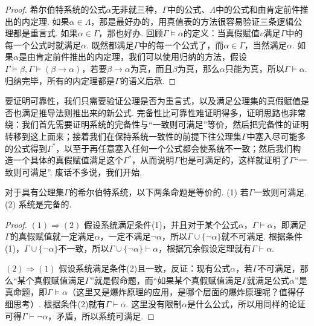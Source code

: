 \documentclass[main.tex]{subfiles}
\begin{document}
\begin{proof}
    希尔伯特系统的公式\(\alpha\)无非就三种，\(\Gamma\)中的公式、\(\Lambda\)中的公式和由肯定前件推出的内定理. \newline
    如果\(\alpha \in \Lambda\)，那是最好办的，用真值表的方法很容易验证三条逻辑公理都是重言式. \newline
    如果\(\alpha \in \Gamma\)，那也好办. 回顾\(\Gamma \vDash \alpha\)的定义：当真假赋值\(v\)满足\(\Gamma\)中的每一个公式时就满足\(\alpha\). 既然都满足\(\Gamma\)中的每一个公式了，而\(\alpha \in \Gamma\)，当然满足\(\alpha\). \newline
    如果\(\alpha\)是由肯定前件推出的内定理，我们可以使用归纳的方法，假设\(\Gamma \vDash \beta, \Gamma \vDash (\beta \to \alpha)\)，若要\(\beta \to \alpha\)为真，而且\(\beta\)为真，那么\(\alpha\)只能为真，所以\(\Gamma \vDash \alpha\). 归纳完毕，所有的内定理都是\(\Gamma\)的语义后承.
\end{proof}


\vspace{1cm}

要证明可靠性，我们只需要验证公理是否为重言式，以及满足公理集的真假赋值是否也满足推导法则推出来的新公式. 完备性比可靠性难证明得多，证明思路也非常绕：我们首先需要证明系统的完备性与“一致则可满足”等价，然后把完备性的证明转移到这上面来；接着我们在保持系统一致性的前提下往公理集\(\Gamma\)中塞入尽可能多的公式得到\(\Gamma^*\)，以至于再任意塞入任何一个公式都会使系统不一致；然后我们构造一个具体的真假赋值满足这个\(\Gamma^*\)，从而说明\(\Gamma\)也是可满足的，这样就证明了\(\Gamma\)“一致则可满足”. 废话不多说，我们开始.

\begin{lemma}{}
    对于具有公理集\(\Gamma\)的希尔伯特系统，以下两条命题是等价的. \newline
    (1) 若\(\Gamma\)一致则可满足. \newline
    (2) 系统是完备的.
\end{lemma}

\begin{proof}
    \((1)\Rightarrow(2)\)  假设系统满足条件(1)，并且对于某个公式\(\alpha\)，\(\Gamma \vDash \alpha\)，即满足\(\Gamma\)的真假赋值就一定满足\(\alpha\)，一定不满足\(\neg\alpha\)，所以\(\Gamma \cup \{\neg\alpha\}\)就不可满足. 根据条件(1)，\(\Gamma \cup \{\neg\alpha\}\)不一致，所以\(\Gamma \cup \{\neg \alpha\} \vdash \alpha\)，根据冗余假设定理就有\(\Gamma \vdash \alpha\).

    \((2)\Rightarrow(1)\)  假设系统满足条件(2)且一致，反证：现有公式\(\alpha\)，若\(\Gamma\)不可满足，那么“某个真假赋值满足\(\Gamma\)”就是假命题，而“如果某个真假赋值满足\(\Gamma\)就满足公式\(\alpha\)”是真命题，即\(\Gamma \vDash \alpha\)（这里又是爆炸原理的应用，是哪个层面的爆炸原理呢？值得仔细思考）. 根据条件(2)就有\(\Gamma \vdash \alpha\). 这里没有限制\(\alpha\)是什么公式，所以用同样的论证可得\(\Gamma \vdash \neg \alpha\)，矛盾，所以系统可满足.
\end{proof}
\end{document}
